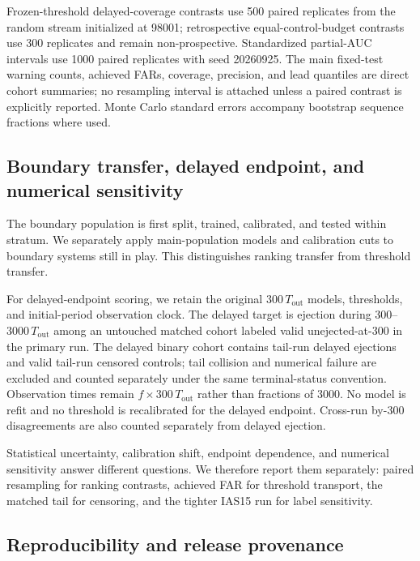 \documentclass[linenumbers,twocolumn]{aastex702}
\newcommand{\Tout}{T_{\mathrm{out}}}
\begin{document}
Frozen-threshold delayed-coverage contrasts use 500 paired replicates from the random stream initialized at 98001; retrospective equal-control-budget contrasts use 300 replicates and remain non-prospective. Standardized partial-AUC intervals use 1000 paired replicates with seed 20260925. The main fixed-test warning counts, achieved FARs, coverage, precision, and lead quantiles are direct cohort summaries; no resampling interval is attached unless a paired contrast is explicitly reported. Monte Carlo standard errors accompany bootstrap sequence fractions where used.

\subsection{Boundary transfer, delayed endpoint, and numerical sensitivity}\label{sec:robustness_methods}

The boundary population is first split, trained, calibrated, and tested within stratum. We separately apply main-population models and calibration cuts to boundary systems still in play. This distinguishes ranking transfer from threshold transfer.

For delayed-endpoint scoring, we retain the original $300\,\Tout$ models, thresholds, and initial-period observation clock. The delayed target is ejection during $300$--$3000\,\Tout$ among an untouched matched cohort labeled valid unejected-at-300 in the primary run. The delayed binary cohort contains tail-run delayed ejections and valid tail-run censored controls; tail collision and numerical failure are excluded and counted separately under the same terminal-status convention. Observation times remain $f\times300\,\Tout$ rather than fractions of 3000. No model is refit and no threshold is recalibrated for the delayed endpoint. Cross-run by-300 disagreements are also counted separately from delayed ejection.

Statistical uncertainty, calibration shift, endpoint dependence, and numerical sensitivity answer different questions. We therefore report them separately: paired resampling for ranking contrasts, achieved FAR for threshold transport, the matched tail for censoring, and the tighter IAS15 run for label sensitivity.

\subsection{Reproducibility and release provenance}\label{sec:provenance}
\end{document}
